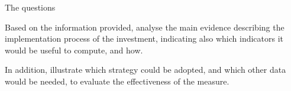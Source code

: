 \documentclass[aspectratio=169,xcolor=table]{beamer}
\begin{document}
\begin{frame}{The questions}
\begin{block}{}
Based on the information provided, analyse the main evidence describing the implementation process of the investment, indicating also which indicators it would be useful to compute, and how.
\end{block}
\vspace{0.2cm}
\begin{block}{}
In addition, illustrate which strategy could be adopted, and which other data would be needed, to evaluate the effectiveness of the measure.
\end{block}
\end{frame}
\end{document}
